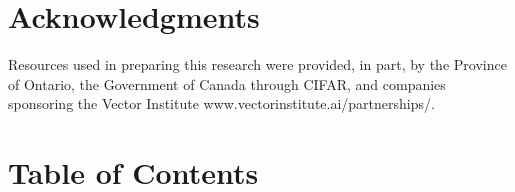 \documentclass{article}
\theoremstyle{plain}
\theoremstyle{definition}
\theoremstyle{remark}
\begin{document}
\section*{Acknowledgments}
Resources used in preparing this research were provided, in part, by the Province of Ontario, the Government of Canada through CIFAR, and companies sponsoring the Vector Institute www.vectorinstitute.ai/partnerships/.





\newpage
\appendix
\onecolumn
\startcontents[appendices] %
\section*{Table of Contents} %



\newpage
\end{document}
